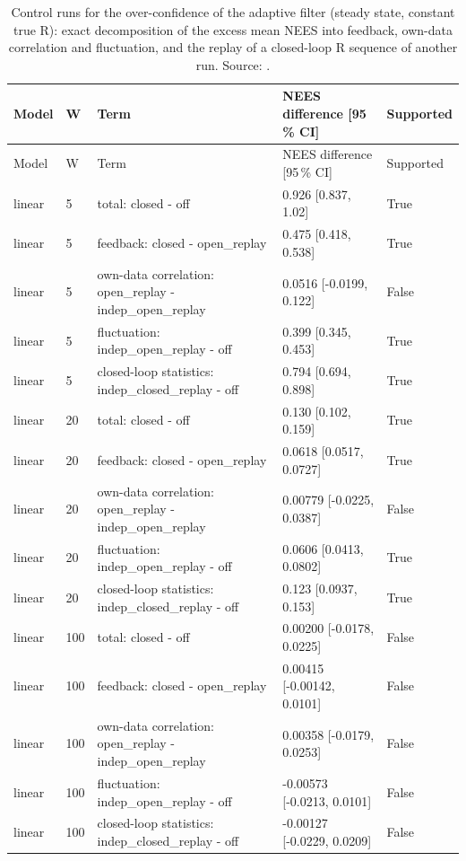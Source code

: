{\scriptsize
\begin{longtable}{lllll}
\caption{Control runs for the over-confidence of the adaptive filter (steady state, constant true R): exact decomposition of the excess mean NEES into feedback, own-data correlation and fluctuation, and the replay of a closed-loop R sequence of another run. Source: .}\label{tab:ar_decomp}\\
\toprule
Model & W & Term & NEES difference [95\,\% CI] & Supported \\
\midrule
\endfirsthead
\toprule
Model & W & Term & NEES difference [95\,\% CI] & Supported \\
\midrule
\endhead
linear & 5 & total: closed - off & 0.926 [0.837, 1.02] & True \\
linear & 5 & feedback: closed - open\_replay & 0.475 [0.418, 0.538] & True \\
linear & 5 & own-data correlation: open\_replay - indep\_open\_replay & 0.0516 [-0.0199, 0.122] & False \\
linear & 5 & fluctuation: indep\_open\_replay - off & 0.399 [0.345, 0.453] & True \\
linear & 5 & closed-loop statistics: indep\_closed\_replay - off & 0.794 [0.694, 0.898] & True \\
linear & 20 & total: closed - off & 0.130 [0.102, 0.159] & True \\
linear & 20 & feedback: closed - open\_replay & 0.0618 [0.0517, 0.0727] & True \\
linear & 20 & own-data correlation: open\_replay - indep\_open\_replay & 0.00779 [-0.0225, 0.0387] & False \\
linear & 20 & fluctuation: indep\_open\_replay - off & 0.0606 [0.0413, 0.0802] & True \\
linear & 20 & closed-loop statistics: indep\_closed\_replay - off & 0.123 [0.0937, 0.153] & True \\
linear & 100 & total: closed - off & 0.00200 [-0.0178, 0.0225] & False \\
linear & 100 & feedback: closed - open\_replay & 0.00415 [-0.00142, 0.0101] & False \\
linear & 100 & own-data correlation: open\_replay - indep\_open\_replay & 0.00358 [-0.0179, 0.0253] & False \\
linear & 100 & fluctuation: indep\_open\_replay - off & -0.00573 [-0.0213, 0.0101] & False \\
linear & 100 & closed-loop statistics: indep\_closed\_replay - off & -0.00127 [-0.0229, 0.0209] & False \\

\end{longtable}}
